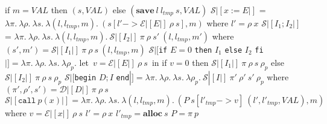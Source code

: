 \documentclass[12pt]{minimal}
\begin{document}
\indent if $m = \textit{VAL}$ then $(s, \textit{VAL})$ \newline
\indent else $(\textbf{save}~l~l_{tmp}~s, \textit{VAL})$\newline
\newline
$\mathcal{S}|[x := E|]$ = $\lambda \pi.~\lambda \rho.~\lambda s.~\lambda (l, l_{tmp}, m).~(s[l' -> \mathcal{E}|[E|]~\rho~s], m)$\newline
\indent where $l' = \rho~x$\newline
$\mathcal{S}|[I_1;I_2|]$ = $\lambda \pi.~\lambda \rho.~\lambda s.~\lambda (l, l_{tmp}, m).~\mathcal{S}|[I_2|]~\pi~\rho~s'~(l, l_{tmp}, m')$\newline
\indent where $(s', m') = \mathcal{S}|[I_1|]~\pi~\rho~s~(l, l_{tmp}, m)$\newline
$\mathcal{S}|[$\texttt{if} $E = 0$ \texttt{then} $I_1$ \texttt{else} $I_2$ \texttt{fi}$|] = \lambda \pi.~\lambda \rho.~\lambda s.~\lambda \rho_p.$\newline
\indent let~$v = \mathcal{E}|[E|]~\rho~s$~in\newline
\indent\indent if $v = 0$ then $\mathcal{S}|[I_1|]~\pi~\rho~s~\rho_p$\newline
\indent\indent else $\mathcal{S}|[I_2|]~\pi~\rho~s~\rho_p$\newline
$\mathcal{S}|[$\texttt{begin} $D;I$ \texttt{end}$|] = \lambda \pi.~\lambda \rho.~\lambda s.~\lambda \rho_p.~\mathcal{S}|[I|]~\pi'~\rho'~s'~\rho_p$\newline
\indent where $(\pi', \rho', s') = \mathcal{D}|[D|]~\pi~\rho~s$\newline
$\mathcal{S}|[\texttt{call}~p(x)|] = \lambda \pi.~\lambda \rho.~\lambda s.~\lambda (l, l_{tmp}, m).~(P~s[l'_{tmp} -> v]~(l', l'_{tmp}, \textit{VAL}), m)$\newline
\indent where\newline
\indent\indent$v = \mathcal{E}|[x|]~\rho~s$\newline
\indent\indent$l' = \rho~x$\newline
\indent\indent$l'_{tmp} = \textbf{alloc}~s$\newline
\indent\indent$P = \pi~p$
\end{document}
